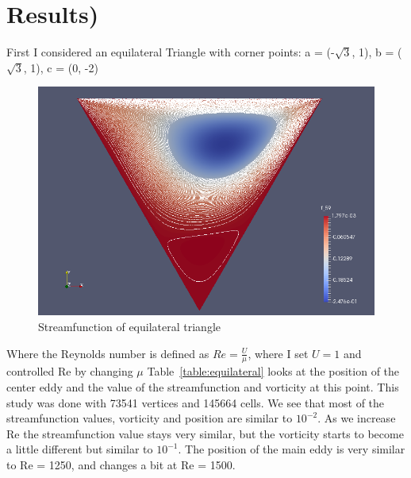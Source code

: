 \documentclass[a4paper,norsk]{article}
\begin{document}
\section*{Results)}
First I considered an equilateral Triangle with corner points: \newline
a = (-$\sqrt{3}$, 1), b = ($\sqrt{3}$, 1),  c = (0, -2) \newline
\begin{figure}
    \centering
    \includegraphics[trim = 25mm 0mm 25mm 0mm, clip, scale=0.4]{Equilateral_Re_100.png}
    \caption{Streamfunction of equilateral triangle}
    \label{fig:awesome_image}
\end{figure}
\newline
Where the Reynolds number is defined as $Re = \frac{U}{\mu} $, where I set $U=1$ and controlled Re by changing $\mu$
\newline
Table~\ref{table:equilateral} looks at the position of the center eddy and the value of the streamfunction and vorticity at this point. \newline
This study was done with 73541 vertices and 145664 cells. \newline
We see that most of the streamfunction values, vorticity and position are similar to $10^{-2}$. As we increase Re the streamfunction value stays very similar, but the vorticity starts to become a little different but similar to $10^{-1}$. 
The position of the main eddy is very similar to Re = 1250, and changes a bit at Re = 1500.
\newline
\end{document}
